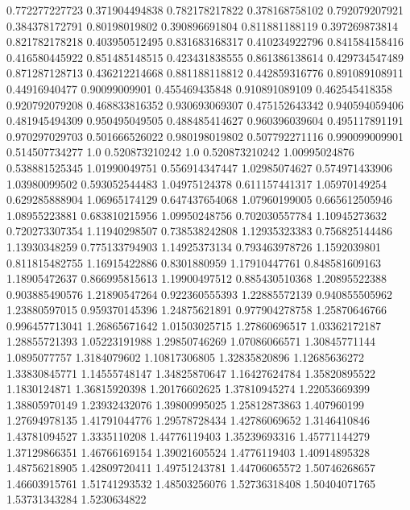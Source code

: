  0.772277227723   0.371904494838
 0.782178217822   0.378168758102
 0.792079207921   0.384378172791
  0.80198019802   0.390896691804
 0.811881188119   0.397269873814
 0.821782178218   0.403950512495
 0.831683168317   0.410234922796
 0.841584158416   0.416580445922
 0.851485148515   0.423431838555
 0.861386138614   0.429734547489
 0.871287128713   0.436212214668
 0.881188118812   0.442859316776
 0.891089108911    0.44916940477
  0.90099009901   0.455469435848
 0.910891089109   0.462545418358
 0.920792079208   0.468833816352
 0.930693069307   0.475152643342
 0.940594059406   0.481945494309
 0.950495049505   0.488485414627
 0.960396039604   0.495117891191
 0.970297029703   0.501666526022
 0.980198019802   0.507792271116
 0.990099009901   0.514507734277
            1.0   0.520873210242
            1.0   0.520873210242
  1.00995024876   0.538881525345
  1.01990049751   0.556914347447
  1.02985074627   0.574971433906
  1.03980099502   0.593052544483
  1.04975124378   0.611157441317
  1.05970149254   0.629285888904
  1.06965174129   0.647437654068
  1.07960199005   0.665612505946
  1.08955223881   0.683810215956
  1.09950248756   0.702030557784
  1.10945273632   0.720273307354
  1.11940298507   0.738538242808
  1.12935323383   0.756825144486
  1.13930348259   0.775133794903
  1.14925373134   0.793463978726
   1.1592039801   0.811815482755
  1.16915422886     0.8301880959
  1.17910447761   0.848581609163
  1.18905472637   0.866995815613
  1.19900497512   0.885430510368
  1.20895522388   0.903885490576
  1.21890547264   0.922360555393
  1.22885572139   0.940855505962
  1.23880597015   0.959370145396
  1.24875621891   0.977904278758
  1.25870646766   0.996457713041
  1.26865671642    1.01503025715
  1.27860696517    1.03362172187
  1.28855721393    1.05223191988
  1.29850746269    1.07086066571
  1.30845771144     1.0895077757
   1.3184079602    1.10817306805
  1.32835820896    1.12685636272
  1.33830845771    1.14555748147
  1.34825870647    1.16427624784
  1.35820895522     1.1830124871
  1.36815920398    1.20176602625
  1.37810945274    1.22053669399
  1.38805970149    1.23932432076
  1.39800995025    1.25812873863
    1.407960199    1.27694978135
  1.41791044776    1.29578728434
  1.42786069652     1.3146410846
  1.43781094527     1.3335110208
  1.44776119403    1.35239693316
  1.45771144279    1.37129866351
  1.46766169154    1.39021605524
   1.4776119403    1.40914895328
  1.48756218905    1.42809720411
  1.49751243781    1.44706065572
  1.50746268657    1.46603915761
  1.51741293532    1.48503256076
  1.52736318408    1.50404071765
  1.53731343284     1.5230634822
